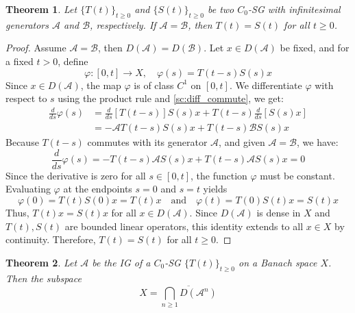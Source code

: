\documentclass[12pt, oneside]{book}
\newtheorem{theo}{Theorem}[section]
\newcommand{\A}{\mathscr{A}}
\newcommand{\B}{\mathscr{B}}
\begin{document}
\begin{theo}
	Let $\{T(t)\}_{t \ge 0}$ and $\{S(t)\}_{t \ge 0}$ be two $C_0$-SG with infinitesimal generators $\A$ and $\B$, respectively. If $\A = \B$, then $T(t) = S(t)$ for all $t \ge 0$.
\end{theo}

\begin{proof}
	Assume $\A = \B$, then $D(\A) = D(\B)$. Let $x \in D(\A)$ be fixed, and for a fixed $t > 0$, define
$$
    \varphi: [0, t] \to X, \quad \varphi(s) = T(t-s)S(s)x
$$
Since $x \in D(\A)$, the map $\varphi$ is of class $C^1$ on $[0, t]$. We differentiate $\varphi$ with respect to $s$ using the product rule and \ref{sc:diff_commute}, we get:
\begin{align*}
    \frac{d}{ds} \varphi(s) &= \frac{d}{ds} [T(t-s)] S(s)x + T(t-s) \frac{d}{ds} [S(s)x] \\
    &= -\A T(t-s)S(s)x + T(t-s) \B S(s)x
\end{align*}
Because $T(t-s)$ commutes with its generator $\A$, and given $\A = \B$, we have:
$$
    \frac{d}{ds} \varphi(s) = -T(t-s)\A S(s)x + T(t-s)\A S(s)x = 0
$$
Since the derivative is zero for all $s \in [0, t]$, the function $\varphi$ must be constant. Evaluating $\varphi$ at the endpoints $s=0$ and $s=t$ yields
$$
    \varphi(0) = T(t)S(0)x = T(t)x \quad \text{and} \quad \varphi(t) = T(0)S(t)x = S(t)x
$$
Thus, $T(t)x = S(t)x$ for all $x \in D(\A)$. Since $D(\A)$ is dense in $X$ and $T(t), S(t)$ are bounded linear operators, this identity extends to all $x \in X$ by continuity. Therefore, $T(t) = S(t)$ for all $t \ge 0$.
\end{proof}

\begin{theo}
Let $\A$ be the IG of a $C_0$-SG $\{T(t)\}_{t \ge 0}$ on a Banach space $X$. Then the subspace
$$
	X = \overline{\bigcap_{n \ge 1} D(\A^n)}
$$
\end{theo}
\end{document}
